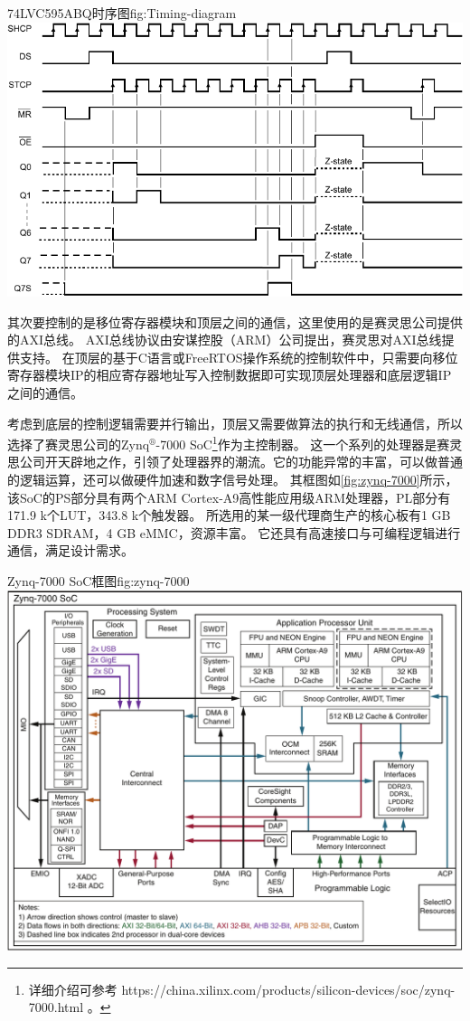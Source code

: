 \documentclass[supercite]{HustGraduPaper}
\begin{document}
\begin{generalfig}[htb]{74LVC595ABQ时序图}{fig:Timing-diagram}
	\includegraphics[width=0.8\linewidth]{Figures/Timing-diagram.pdf}
\end{generalfig}

其次要控制的是移位寄存器模块和顶层之间的通信，这里使用的是赛灵思公司提供的AXI总线。
AXI总线协议由安谋控股（ARM）公司提出，赛灵思对AXI总线提供支持。
在顶层的基于C语言或FreeRTOS操作系统的控制软件中，只需要向移位寄存器模块IP的相应寄存器地址写入控制数据即可实现顶层处理器和底层逻辑IP之间的通信。

考虑到底层的控制逻辑需要并行输出，顶层又需要做算法的执行和无线通信，所以选择了赛灵思公司的Zynq$^\circledR$-7000 SoC\footnote{详细介绍可参考 https://china.xilinx.com/products/silicon-devices/soc/zynq-7000.html 。}作为主控制器。
这一个系列的处理器是赛灵思公司开天辟地之作，引领了处理器界的潮流。它的功能异常的丰富，可以做普通的逻辑运算，还可以做硬件加速和数字信号处理。
其框图如\autoref{fig:zynq-7000}所示，该SoC的PS部分具有两个ARM Cortex-A9高性能应用级ARM处理器，PL部分有171.9 k个LUT，343.8 k个触发器。
所选用的某一级代理商生产的核心板有1 GB DDR3 SDRAM，4 GB eMMC，资源丰富。
它还具有高速接口与可编程逻辑进行通信，满足设计需求。

\begin{generalfig}[htb]{Zynq-7000 SoC框图}{fig:zynq-7000}
	\includegraphics[width=0.8\linewidth]{Figures/zynq-7000.pdf}
\end{generalfig}
\end{document}
